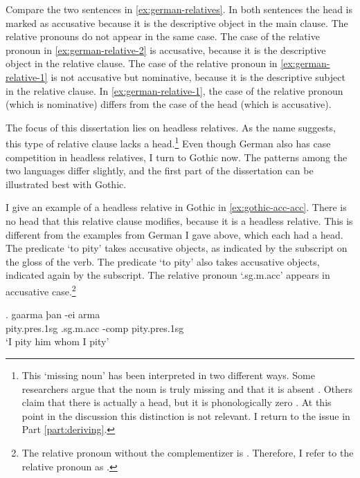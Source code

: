 Compare the two sentences in \ref{ex:german-relatives}. In both sentences the head is marked as accusative because it is the descriptive object in the main clause. The relative pronouns do not appear in the same case. The case of the relative pronoun in \ref{ex:german-relative-2} is accusative, because it is the descriptive object in the relative clause. The case of the relative pronoun in \ref{ex:german-relative-1} is not accusative but nominative, because it is the descriptive subject in the relative clause. In \ref{ex:german-relative-1}, the case of the relative pronoun (which is nominative) differs from the case of the head (which is accusative).

The focus of this dissertation lies on headless relatives. As the name suggests, this type of relative clause lacks a head.\footnote{
This `missing noun' has been interpreted in two different ways. Some researchers argue that the noun is truly missing and that it is absent \citep[cf.][]{citko2005,vanriemsdijk2006}. Others claim that there is actually a head, but it is phonologically zero \citep[cf.][]{bresnan1978,groos1981,grosu2003}. At this point in the discussion this distinction is not relevant. I return to the issue in Part \ref{part:deriving}.
}
Even though German also has case competition in headless relatives, I turn to Gothic now. The patterns among the two languages differ slightly, and the first part of the dissertation can be illustrated best with Gothic.

I give an example of a headless relative in Gothic in \ref{ex:gothic-acc-acc}.
There is no head that this relative clause modifies, because it is a headless relative. This is different from the examples from German I gave above, which each had a head.
The predicate  `to pity' takes accusative objects, as indicated by the subscript on the gloss of the verb. The predicate  `to pity' also takes accusative objects, indicated again by the subscript.
The relative pronoun  `.\ac{sg}.\ac{m}.\ac{acc}' appears in accusative case.\footnote{
The relative pronoun without the complementizer  is . Therefore, I refer to the relative pronoun as .
}

\exg. gaarma þan -ei arma\\
 pity.\ac{pres}.1\ac{sg}\scsub{[acc]} .\ac{sg}.\ac{m}.\ac{acc} -\ac{comp} pity.\ac{pres}.1\ac{sg}\scsub{[acc]}\\
 `I pity him whom I pity' \label{ex:gothic-acc-acc}

